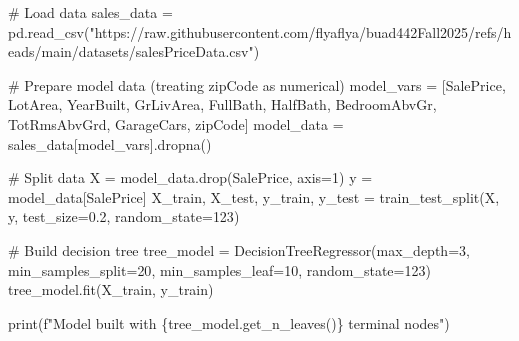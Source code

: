 \documentclass[
  letterpaper,
  DIV=11,
  numbers=noendperiod]{scrartcl}
\newenvironment{Shaded}{\begin{snugshade}}{\end{snugshade}}
\newcommand{\BuiltInTok}[1]{\textcolor[rgb]{0.00,0.23,0.31}{#1}}
\newcommand{\CommentTok}[1]{\textcolor[rgb]{0.37,0.37,0.37}{#1}}
\newcommand{\DecValTok}[1]{\textcolor[rgb]{0.68,0.00,0.00}{#1}}
\newcommand{\FloatTok}[1]{\textcolor[rgb]{0.68,0.00,0.00}{#1}}
\newcommand{\NormalTok}[1]{\textcolor[rgb]{0.00,0.23,0.31}{#1}}
\newcommand{\OperatorTok}[1]{\textcolor[rgb]{0.37,0.37,0.37}{#1}}
\newcommand{\SpecialCharTok}[1]{\textcolor[rgb]{0.37,0.37,0.37}{#1}}
\newcommand{\SpecialStringTok}[1]{\textcolor[rgb]{0.13,0.47,0.30}{#1}}
\newcommand{\StringTok}[1]{\textcolor[rgb]{0.13,0.47,0.30}{#1}}
\begin{document}
\begin{tcolorbox}
\begin{Shaded}
\begin{Highlighting}[]
\CommentTok{\# Load data}
\NormalTok{sales\_data }\OperatorTok{=}\NormalTok{ pd.read\_csv(}\StringTok{"https://raw.githubusercontent.com/flyaflya/buad442Fall2025/refs/heads/main/datasets/salesPriceData.csv"}\NormalTok{)}

\CommentTok{\# Prepare model data (treating zipCode as numerical)}
\NormalTok{model\_vars }\OperatorTok{=}\NormalTok{ [}\StringTok{\textquotesingle{}SalePrice\textquotesingle{}}\NormalTok{, }\StringTok{\textquotesingle{}LotArea\textquotesingle{}}\NormalTok{, }\StringTok{\textquotesingle{}YearBuilt\textquotesingle{}}\NormalTok{, }\StringTok{\textquotesingle{}GrLivArea\textquotesingle{}}\NormalTok{, }\StringTok{\textquotesingle{}FullBath\textquotesingle{}}\NormalTok{, }
              \StringTok{\textquotesingle{}HalfBath\textquotesingle{}}\NormalTok{, }\StringTok{\textquotesingle{}BedroomAbvGr\textquotesingle{}}\NormalTok{, }\StringTok{\textquotesingle{}TotRmsAbvGrd\textquotesingle{}}\NormalTok{, }\StringTok{\textquotesingle{}GarageCars\textquotesingle{}}\NormalTok{, }\StringTok{\textquotesingle{}zipCode\textquotesingle{}}\NormalTok{]}
\NormalTok{model\_data }\OperatorTok{=}\NormalTok{ sales\_data[model\_vars].dropna()}

\CommentTok{\# Split data}
\NormalTok{X }\OperatorTok{=}\NormalTok{ model\_data.drop(}\StringTok{\textquotesingle{}SalePrice\textquotesingle{}}\NormalTok{, axis}\OperatorTok{=}\DecValTok{1}\NormalTok{)}
\NormalTok{y }\OperatorTok{=}\NormalTok{ model\_data[}\StringTok{\textquotesingle{}SalePrice\textquotesingle{}}\NormalTok{]}
\NormalTok{X\_train, X\_test, y\_train, y\_test }\OperatorTok{=}\NormalTok{ train\_test\_split(X, y, test\_size}\OperatorTok{=}\FloatTok{0.2}\NormalTok{, random\_state}\OperatorTok{=}\DecValTok{123}\NormalTok{)}

\CommentTok{\# Build decision tree}
\NormalTok{tree\_model }\OperatorTok{=}\NormalTok{ DecisionTreeRegressor(max\_depth}\OperatorTok{=}\DecValTok{3}\NormalTok{, }
\NormalTok{                                  min\_samples\_split}\OperatorTok{=}\DecValTok{20}\NormalTok{, }
\NormalTok{                                  min\_samples\_leaf}\OperatorTok{=}\DecValTok{10}\NormalTok{, }
\NormalTok{                                  random\_state}\OperatorTok{=}\DecValTok{123}\NormalTok{)}
\NormalTok{tree\_model.fit(X\_train, y\_train)}

\BuiltInTok{print}\NormalTok{(}\SpecialStringTok{f"Model built with }\SpecialCharTok{\{}\NormalTok{tree\_model}\SpecialCharTok{.}\NormalTok{get\_n\_leaves()}\SpecialCharTok{\}}\SpecialStringTok{ terminal nodes"}\NormalTok{)}
\end{Highlighting}
\end{Shaded}


\end{tcolorbox}
\end{document}
